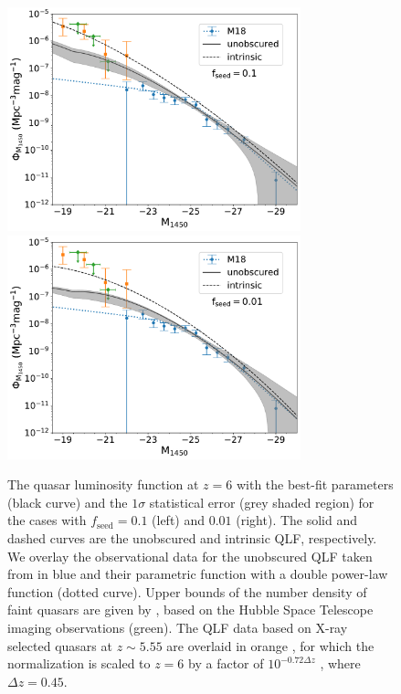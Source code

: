\documentclass[twocolumn, twocolappendix]{aastex63}
\newcommand{\fseed}{f_\mathrm{seed}}
\begin{document}
\begin{CJK*}{UTF8}{gbsn}
\begin{figure}
\centering
\includegraphics[width=85mm]{f1ndraw60LF_spread.pdf}\hspace{3mm}
\includegraphics[width=85mm]{f2ndraw60LF_spread.pdf}
\caption{
The quasar luminosity function at $z=6$ with the best-fit parameters (black curve) and the $1\sigma$ statistical error (grey shaded region) 
for the cases with $\fseed=0.1$ (left) and $0.01$ (right).
The solid and dashed curves are the unobscured and intrinsic QLF, respectively.
We overlay the observational data for the unobscured QLF taken from  in blue and their parametric function with a double power-law function (dotted curve).
Upper bounds of the number density of faint quasars are given by \citet{2022NatAs...6..850J}, based on the Hubble Space Telescope imaging observations (green).
The QLF data based on X-ray selected quasars at $z\sim 5.55$ are overlaid in orange \citep{2019ApJ...884...19G}, for which the normalization is scaled to $z=6$
by a factor of $10^{-0.72\Delta z}$ \citep{2016ApJ...833..222J}, where $\Delta z=0.45$.
}
\label{fig:fitlf}
\vspace{5mm}
\end{figure}




\end{CJK*}
\end{document}
